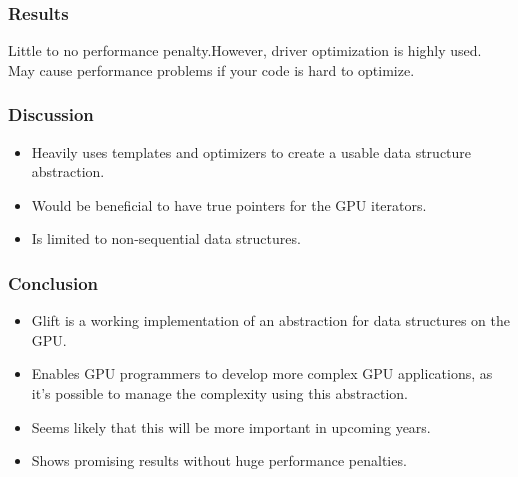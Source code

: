 \documentclass[xcolor={usenames,dvipsnames}]{beamer}
\begin{document}
\begin{frame}
  \frametitle{Results}

  Little to no performance penalty.\pause However, driver optimization is highly
  used. May cause performance problems if your code is hard to optimize.
\end{frame}

\begin{frame}
  \frametitle{Discussion}

  \begin{itemize}
  \item<1-> Heavily uses templates and optimizers to create a usable data
    structure abstraction.
  \item<2-> Would be beneficial to have true pointers for the GPU iterators.
  \item<3-> Is limited to non-sequential data structures.
  \end{itemize}
\end{frame}

\begin{frame}
  \frametitle{Conclusion}

  \begin{itemize}
  \item<+-> Glift is a working implementation of an abstraction for data
    structures on the GPU.
  \item<+-> Enables GPU programmers to develop more complex GPU applications, as
    it's possible to manage the complexity using this abstraction.
  \item<+-> Seems likely that this will be more important in upcoming years.
  \item<+-> Shows promising results without huge performance penalties.
  \end{itemize}
\end{frame}
\end{document}
